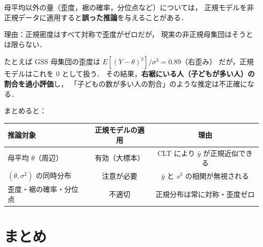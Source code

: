 \documentclass[lualatex,ja=standard,a4paper,12pt]{bxjsarticle}
\begin{document}
\begin{warningbox}
母平均以外の量（歪度，裾の確率，分位点など）については，
正規モデルを非正規データに適用すると\textbf{誤った推論}を与えることがある．

\medskip
理由：正規密度はすべて対称で歪度がゼロだが，
現実の非正規母集団はそうとは限らない．

\medskip
たとえば GSS 母集団の歪度は $E[(Y-\theta)^3]/\sigma^3 = 0.89$（右歪み）
だが，正規モデルはこれを 0 として扱う．
その結果，\textbf{右裾にいる人（子どもが多い人）の割合を過小評価}し，
「子どもの数が多い人の割合」のような推定は不正確になる．
\end{warningbox}

\medskip
\noindent まとめると：

\begin{center}
\renewcommand{\arraystretch}{1.6}
\begin{tabular}{lcc}
\toprule
推論対象 & 正規モデルの適用 & 理由 \\
\midrule
母平均 $\theta$（周辺） & 有効（大標本） & CLT により $\bar{y}$ が正規近似できる \\
$(\theta, \sigma^2)$ の同時分布 & 注意が必要 & $\bar{y}$ と $s^2$ の相関が無視される \\
歪度・裾の確率・分位点 & 不適切 & 正規分布は常に対称・歪度ゼロ \\
\bottomrule
\end{tabular}
\end{center}

\section{まとめ}
\end{document}
